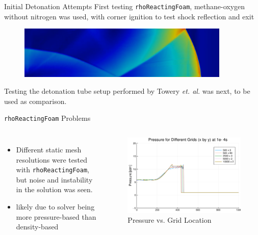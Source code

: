 \begin{frame}{Initial Detonation Attempts}
First testing \texttt{rhoReactingFoam}, methane-oxygen without nitrogen was used, with corner ignition to test shock reflection and exit 
\begin{figure}[]
\centering
\includegraphics[width=0.9\textwidth]{../figs/cornerdet.png}
\end{figure}%
Testing the detonation tube setup performed by Towery \textit{et. al.} \cite{towery1} was next, to be used as comparison. 
\end{frame}

\begin{frame}{\texttt{rhoReactingFoam} Problems}
\begin{columns}
\begin{itemize}
\item Different static mesh resolutions were tested with \texttt{rhoReactingFoam}, but noise and instability in the solution was seen.
\item likely due to solver being more pressure-based than density-based
\end{itemize}
\begin{figure}[]
\centering
\includegraphics[width=\textwidth]{../figs/rhoReactingFoam.png}
\caption*{Pressure vs. Grid Location}
\end{figure}%
\end{columns}
\end{frame}

